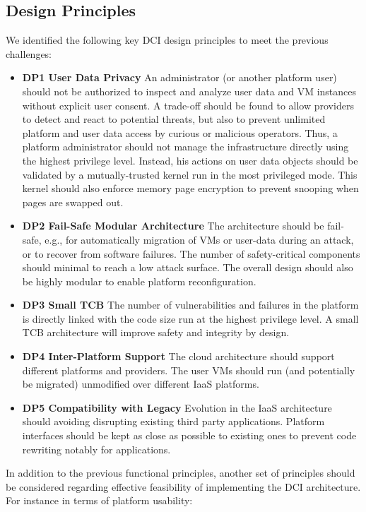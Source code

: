 \documentclass{sig-alternate}
\begin{document}
\subsection{Design Principles}

\noindent We identified the following key DCI design principles to meet the previous challenges: 
\begin{itemize}[]
\item \textbf{DP1 User Data Privacy} An administrator (or another platform user) should not be authorized to inspect and analyze user data and VM instances without explicit user consent. A trade-off should be found to allow providers to detect and react to potential threats, but also to prevent unlimited platform and user data access by curious or malicious operators. Thus, a platform administrator should not manage the infrastructure directly using the highest privilege level. Instead, his actions on user data objects should be validated by a mutually-trusted kernel run in the most privileged mode. This kernel should also enforce memory page encryption to prevent snooping when pages are swapped out.
\item \textbf{DP2 Fail-Safe Modular Architecture} The architecture should be fail-safe, e.g., for automatically migration of VMs or user-data during an attack, or to recover from software failures. The number of safety-critical components should minimal to reach a low attack surface. The overall design should also be highly modular to enable platform reconfiguration.
\item \textbf{DP3 Small TCB} The number of vulnerabilities and failures in the platform is directly linked with the code size run at the highest privilege level. A small TCB architecture will improve safety and integrity by design.
\item \textbf{DP4 Inter-Platform Support} The cloud architecture should support different platforms and providers. The user VMs should run (and potentially be migrated) unmodified over different IaaS platforms.
\item \textbf{DP5 Compatibility with Legacy} Evolution in the IaaS architecture should avoiding disrupting existing third party applications. Platform interfaces should be kept as close as possible to existing ones to prevent code rewriting notably for applications.
\end{itemize}
In addition to the previous functional principles, another set of principles should be considered regarding effective feasibility of implementing the DCI architecture. For instance in terms of platform usability:
\end{document}
